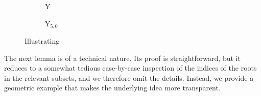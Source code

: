 \begin{figure}[H]
        \centering
        \begin{subfigure}[t]{0.23\textwidth}
        \label{fig: y lem}
        \caption{ $\mathrm{Y}$}
        \end{subfigure}
        \hspace{2cm}
        \begin{subfigure}[t]{0.23\textwidth}
        \label{fig: lem y40}
        \caption{ $\mathrm{Y}_{5,0}$}
        \end{subfigure}
        \caption{Illustrating }
        \label{fig: y en y40}
\end{figure}


The next lemma is of a technical nature. Its proof is straightforward, but it reduces to a somewhat tedious case-by-case inspection of the indices of the roots in the relevant subsets, and we therefore omit the details. Instead, we provide a geometric example that makes the underlying idea more transparent.


